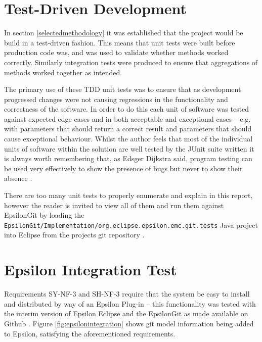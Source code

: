 \documentclass[11pt]{book}
\newcommand{\code}[1]{\texttt{#1}}
\begin{document}
\section{Test-Driven Development}
In section \ref{selectedmethodology} it was established that the project would be build in a test-driven fashion. This means that unit tests were built before production code was, and was used to validate whether methods worked correctly. Similarly integration tests were produced to ensure that aggregations of methods worked together as intended.

The primary use of these TDD unit tests was to ensure that as development progressed changes were not causing regressions in the functionality and correctness of the software. In order to do this each unit of software was tested against expected edge cases and in both acceptable and exceptional cases -- e.g. with parameters that should return a correct result and parameters that should cause exceptional behaviour. Whilst the author feels that most of the individual units of software within the solution are well tested by the JUnit suite written it is always worth remembering that, as Edsger Dijkstra said, program testing can be used very effectively to show the presence of bugs but never to show their absence \cite{edsger}.

There are too many unit tests to properly enumerate and explain in this report, however the reader is invited to view all of them and run them against EpsilonGit by loading the \\  \code{EpsilonGit/Implementation/org.eclipse.epsilon.emc.git.tests} Java project into Eclipse from the projects git repository \cite{epsilongitgithub}.

\section{Epsilon Integration Test}
\label{evalepsilonintegration}
Requirements SY-NF-3 and SH-NF-3 require that the system be easy to install and distributed by way of an Epsilon Plug-in -- this functionality was tested with the interim version of Epsilon Eclipse and the EpsilonGit as made available on Github \cite{epsilongitgithub}. Figure \ref{fig:epsilonintegration} shows git model information being added to Epsilon, satisfying the aforementioned requirements.
\end{document}

